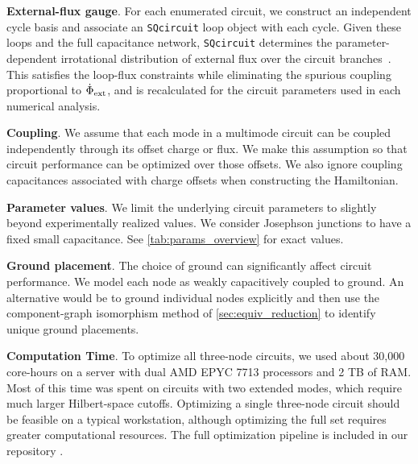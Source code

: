 \textbf{External-flux gauge}. For each enumerated circuit, we construct an independent cycle basis and associate an \texttt{SQcircuit} loop object with each cycle. Given these loops and the full capacitance network, \texttt{SQcircuit} determines the parameter-dependent irrotational distribution of external flux over the circuit branches~\cite{YouKoch2019,BryonExtFlux2023,rajabzadehAnalysisArbitrarySuperconducting2023}. This satisfies the loop-flux constraints while eliminating the spurious coupling proportional to $\dot{\Phi}_{\rm ext}$, and is recalculated for the circuit parameters used in each numerical analysis.


\textbf{Coupling}. We assume that each mode in a multimode circuit can be coupled independently through its offset charge or flux. We make this assumption so that circuit performance can be optimized over those offsets. We also ignore coupling capacitances associated with charge offsets when constructing the Hamiltonian.

\textbf{Parameter values}. We limit the underlying circuit parameters to slightly beyond experimentally realized values. We consider Josephson junctions to have a fixed small capacitance. See \cref{tab:params_overview} for exact values.

\textbf{Ground placement}. The choice of ground can significantly affect circuit performance. We model each node as weakly capacitively coupled to ground. An alternative would be to ground individual nodes explicitly and then use the component-graph isomorphism method of \cref{sec:equiv_reduction} to identify unique ground placements.

\textbf{Computation Time}. To optimize all three-node circuits, we used about 30,000 core-hours on a server with dual AMD EPYC 7713 processors and 2 TB of RAM. Most of this time was spent on circuits with two extended modes, which require much larger Hilbert-space cutoffs. Optimizing a single three-node circuit should be feasible on a typical workstation, although optimizing the full set requires greater computational resources. The full optimization pipeline is included in our repository \cite{sircuitenum_repo}.


